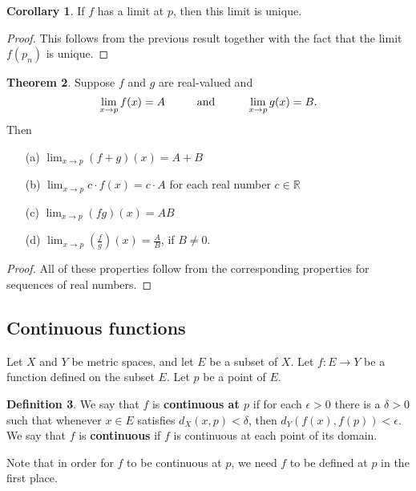 \documentclass[12pt]{article}
\theoremstyle{definition}
\newtheorem{definition}{Definition}
\theoremstyle{theorem}
\newtheorem{theorem}[definition]{Theorem}
\newtheorem{corollary}[definition]{Corollary}
\begin{document}
\begin{corollary}
If $f$ has a limit at $p$, then this limit is unique.  
\end{corollary}

\begin{proof}
This follows from the previous result together with the fact that the limit $f(p_n)$ is unique. 
\end{proof}

\begin{theorem}
Suppose $f$ and $g$ are real-valued and
\[
\lim_{x \to p}f(x) = A \hspace{10mm} \text{and} \hspace{10mm} \lim_{x \to p}g(x) = B.
\]
Then 
\begin{enumerate}
\item[(a)] $\lim_{x \to p} (f+ g)(x) = A + B$ 
\item[(b)] $\lim_{x \to p} c\cdot f(x) = c\cdot A$ for each real number $c \in \mathbb{R}$ 
\item[(c)] $\lim_{x \to p} (fg)(x) = AB$
\item[(d)] $\lim_{x \to p} \left(\frac{f}{g}\right)(x) = \frac{A}{B}$, if $B \ne 0$. 
\end{enumerate}
\end{theorem}

\begin{proof}
All of these properties follow from the corresponding properties for sequences of real numbers. 
\end{proof}

\subsection{Continuous functions}

Let $X$ and $Y$ be metric spaces, and let $E$ be a subset of $X$. Let $f : E \to Y$ be a function defined on the subset $E$. Let $p$ be a point of $E$. 

\begin{definition}
We say that $f$ is \textbf{continuous at $p$} if for each $\epsilon > 0$ there is a $\delta > 0$ such that whenever $x \in E$ satisfies $d_X(x,p) < \delta$, then $d_Y(f(x), f(p)) < \epsilon$. We say that $f$ is \textbf{continuous} if $f$ is continuous at each point of its domain. 
\end{definition}

Note that in order for $f$ to be continuous at $p$, we need $f$ to be defined at $p$ in the first place. 
\end{document}
